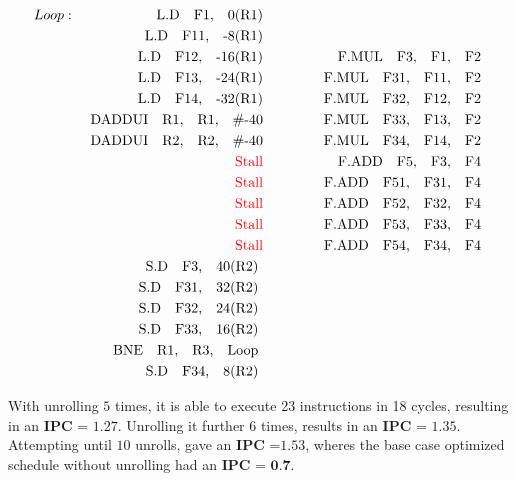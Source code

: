 \documentclass{tufte-handout}
\begin{document}
		\begin{alignat*}{3}
			Loop : & & \mbox{ L.D\quad F1,\quad 0(R1)}       \quad\quad\quad    &&   \\
			       & & \mbox{ L.D\quad F11,\quad -8(R1)}       \quad\quad\quad    &&   \\
			       & & \mbox{ L.D\quad F12,\quad -16(R1)}       \quad\quad\quad    &&  \mbox{ F.MUL\quad F3,\quad F1,\quad F2  }  \\
			       & & \mbox{ L.D\quad F13,\quad -24(R1)}       \quad\quad\quad    &&  \mbox{ F.MUL\quad F31,\quad F11,\quad F2  }   \\
			       & & \mbox{ L.D\quad F14,\quad -32(R1)}       \quad\quad\quad    &&  \mbox{ F.MUL\quad F32,\quad F12,\quad F2  }  \\
			       & & \mbox{ DADDUI\quad R1,\quad R1,\quad \#-40}       \quad\quad\quad    &&  \mbox{ F.MUL\quad F33,\quad F13,\quad F2  }  \\
			       & & \mbox{ DADDUI\quad R2,\quad R2,\quad \#-40}       \quad\quad\quad    &&  \mbox{ F.MUL\quad F34,\quad F14,\quad F2  }  \\
			       & & \mbox{ \textcolor{red}{Stall}}       \quad\quad\quad    &&  \mbox{ F.ADD\quad F5,\quad F3,\quad F4  }  \\
			       & & \mbox{ \textcolor{red}{Stall}}       \quad\quad\quad    &&  \mbox{ F.ADD\quad F51,\quad F31,\quad F4  }  \\
			       & & \mbox{ \textcolor{red}{Stall}}       \quad\quad\quad    &&  \mbox{ F.ADD\quad F52,\quad F32,\quad F4  }  \\
			       & & \mbox{ \textcolor{red}{Stall}}       \quad\quad\quad    &&  \mbox{ F.ADD\quad F53,\quad F33,\quad F4  }  \\
			       & & \mbox{ \textcolor{red}{Stall}}       \quad\quad\quad    &&  \mbox{ F.ADD\quad F54,\quad F34,\quad F4  }  \\
			       & & \mbox{ S.D\quad F3,\quad 40(R2) }       \quad\quad\quad    &&    \\
			       & & \mbox{ S.D\quad F31,\quad 32(R2) }       \quad\quad\quad    &&    \\
			       & & \mbox{ S.D\quad F32,\quad 24(R2) }       \quad\quad\quad    &&    \\
			       & & \mbox{ S.D\quad F33,\quad 16(R2) }       \quad\quad\quad    &&    \\
			       & & \mbox{ BNE\quad R1,\quad R3,\quad Loop }             \quad\quad\quad       &&    \\
			       & & \mbox{ S.D\quad F34,\quad 8(R2) }       \quad\quad\quad    &&    \\
		\end{alignat*}

		With unrolling $5$ times, it is able to execute 23 instructions in 18 cycles, resulting in an $\textbf{IPC = }1.27$.
		Unrolling it further $6$ times, results in an $\textbf{IPC = }1.35$. Attempting until $10$ unrolls, gave an $\textbf{IPC =}1.53$, wheres the base case optimized schedule without unrolling had an $\textbf{IPC = 0.7}$.
		
		

		
  
  
  
  
\end{document}
